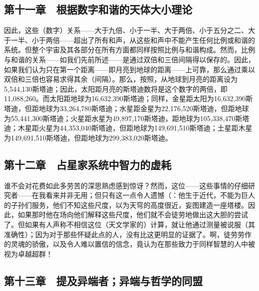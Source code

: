 
\subsection{第十一章　根据数字和谐的天体大小理论}

因此，这些（数字）关系——大于九倍、小于一半、大于两倍、小于五分之二、大于一半、小于两倍——超出了所有和声，从这些和声中不能产生任何比例或和谐的系统。但整个宇宙及其各部分在所有方面都同样按照比例与和谐构成。然而，比例与和谐的关系——如我们先前所述——是通过双倍和三倍间隔得以保存的。因此，如果我们认为只在第一个距离——即月亮到地球的距离——上可靠，那么通过乘以双倍和三倍也容易求得其余（间隔）。那么，按照，从地球到月亮的距离设为5,544,130斯塔迪；因此，太阳距月亮的斯塔迪数将是这个数字的两倍，即11,088,260。而太阳距地球为16,632,390斯塔迪；同样，金星距太阳为16,632,390斯塔迪，但距地球为33,264,780斯塔迪；水星距金星为22,176,520斯塔迪，但距地球为55,441,300斯塔迪；火星距水星为49,897,170斯塔迪，距地球为105,338,470斯塔迪；木星距火星为44,353,040斯塔迪，但距地球为149,691,510斯塔迪；土星距木星为149,691,510斯塔迪，但距地球为299,383,020斯塔迪。\par


\subsection{第十二章　占星家系统中智力的虚耗}

谁不会对花费如此多劳苦的深思熟虑感到惊讶？然而，这位——这些事情的仔细研究者——在我看来并非无用；但只有这一点令人遗憾（：他生于近代，不能为巨人的子孙们服务，他们不知这些尺度，以为天穹的高度很近，妄图建造一座塔楼。因此，如果那时他在场向他们解释这些尺度，他们就不会徒劳地做出这大胆的尝试了。但如果有人声称不相信这位（天文学家的）计算，就让他通过测量被说服（其准确性）；因为对于那些怀疑此点的人，没有比这更明显的证据了。啊，徒劳劳作的灵魂的骄傲，以及令人难以置信的信念，竟认为在那些致力于同样智慧的人中被视为卓越超群！\par


\subsection{第十三章　提及异端者；异端与哲学的同盟}

